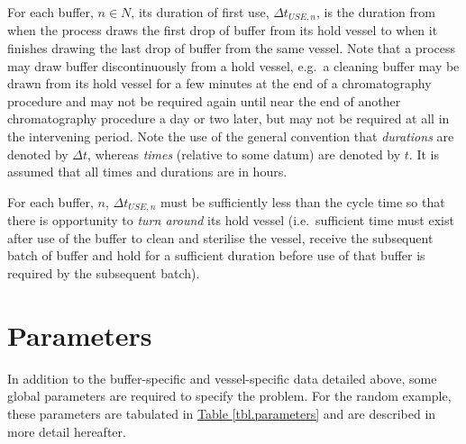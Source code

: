 For each buffer, $n \in N$, its duration of first use,
$\Delta t_{\mathit{USE},n}$, is the duration from when the process draws the
first drop of buffer from its hold vessel to when it finishes drawing the last
drop of buffer from the same vessel.
Note that a process may draw buffer discontinuously from a hold vessel, e.g.\ a
cleaning buffer may be drawn from its hold vessel for a few minutes at the end
of a chromatography procedure and may not be required again until near the end
of another chromatography procedure a day or two later, but may not be required
at all in the intervening period.
Note the use of the general convention that \emph{durations} are denoted by
$\Delta t$, whereas \emph{times} (relative to some datum) are denoted by $t$.
It is assumed that all times and durations are in hours.

For each buffer, $n$, $\Delta t_{\mathit{USE},n}$ must be sufficiently less
than the cycle time so that there is opportunity to \emph{turn around} its hold
vessel (i.e.\ sufficient time must exist after use of the buffer to clean and
sterilise the vessel, receive the subsequent batch of buffer and hold for a
sufficient duration before use of that buffer is required by the subsequent
batch).

\section{Parameters}\label{S.parameters}

In addition to the buffer-specific and vessel-specific data detailed above,
some global parameters are required to specify the problem.
For the random example, these parameters are tabulated in
\hyperref[tbl.parameters]{Table \ref*{tbl.parameters}} and are described in
more detail hereafter.

